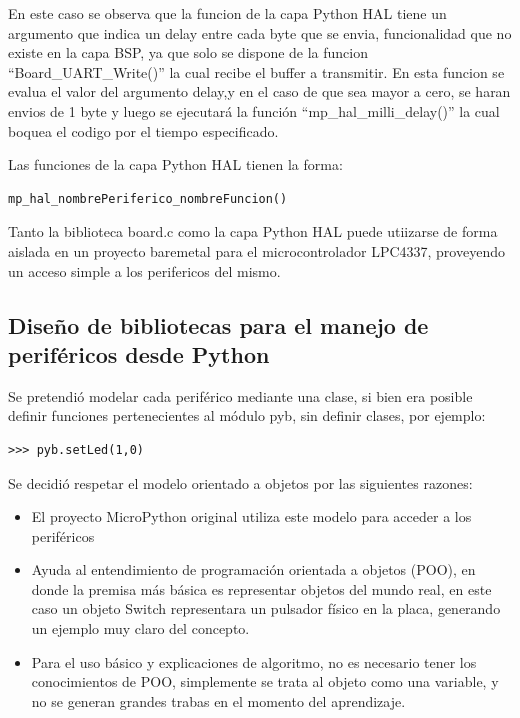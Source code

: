 En este caso se observa que la funcion de la capa Python HAL tiene un argumento que indica un delay entre cada byte que se envia, funcionalidad que no existe en la capa BSP, ya que solo se dispone de la funcion “Board\_UART\_Write()” la cual recibe el buffer a transmitir.
En esta funcion se evalua el valor del argumento delay,y en el caso de que sea mayor a cero, se haran envios de 1 byte y luego se ejecutará la función “mp\_hal\_milli\_delay()” la cual boquea el codigo por el tiempo especificado.

Las funciones de la capa Python HAL tienen la forma:

\begin{verbatim}
mp_hal_nombrePeriferico_nombreFuncion()
\end{verbatim}

Tanto la biblioteca board.c como la capa Python HAL puede utiizarse de forma aislada en un proyecto baremetal para el microcontrolador LPC4337, proveyendo un acceso simple a los perifericos del mismo.


\subsection{Diseño de bibliotecas para el manejo de periféricos desde Python}

Se pretendió modelar cada periférico mediante una clase, si bien era posible definir funciones pertenecientes al módulo pyb, sin definir clases, por ejemplo:
\begin{verbatim}
>>> pyb.setLed(1,0)
\end{verbatim}

Se decidió respetar el modelo orientado a objetos por las siguientes razones:

\begin{itemize}
	\item El proyecto MicroPython original utiliza este modelo para acceder a los periféricos
	\item Ayuda al entendimiento de programación orientada a objetos (POO), en donde la premisa más básica es representar objetos del mundo real, en este caso un objeto Switch representara un pulsador físico en la placa, generando un ejemplo muy claro del concepto.
	\item Para el uso básico y explicaciones de algoritmo, no es necesario tener los conocimientos de POO, simplemente se trata al objeto como una variable, y no se generan grandes trabas en el momento del aprendizaje.
\end{itemize}

